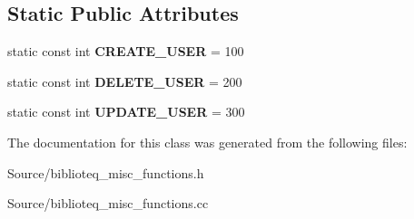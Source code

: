 \subsection*{Static Public Attributes}
\begin{DoxyCompactItemize}
\item 
static const int {\bfseries C\+R\+E\+A\+T\+E\+\_\+\+U\+S\+ER} = 100\hypertarget{classbiblioteq__misc__functions_ae3de728a9495cacac27b599ffb12d970}{}\label{classbiblioteq__misc__functions_ae3de728a9495cacac27b599ffb12d970}

\item 
static const int {\bfseries D\+E\+L\+E\+T\+E\+\_\+\+U\+S\+ER} = 200\hypertarget{classbiblioteq__misc__functions_a72c64b03e7f5bae21ec497590ba7a3da}{}\label{classbiblioteq__misc__functions_a72c64b03e7f5bae21ec497590ba7a3da}

\item 
static const int {\bfseries U\+P\+D\+A\+T\+E\+\_\+\+U\+S\+ER} = 300\hypertarget{classbiblioteq__misc__functions_a3bd6c8daad1bcf624545727bb9b743ea}{}\label{classbiblioteq__misc__functions_a3bd6c8daad1bcf624545727bb9b743ea}

\end{DoxyCompactItemize}


The documentation for this class was generated from the following files\+:\begin{DoxyCompactItemize}
\item 
Source/biblioteq\+\_\+misc\+\_\+functions.\+h\item 
Source/biblioteq\+\_\+misc\+\_\+functions.\+cc\end{DoxyCompactItemize}
